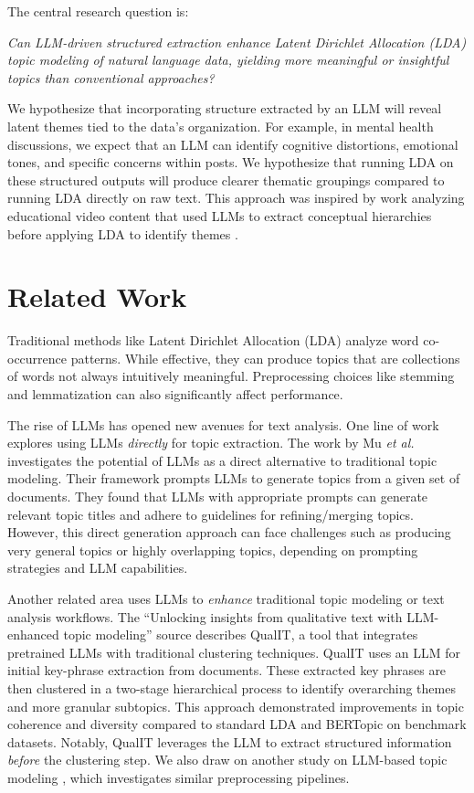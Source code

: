 \documentclass{article}
\begin{document}
The central research question is:

\begin{center}
    \emph{Can LLM-driven structured extraction enhance Latent Dirichlet Allocation (LDA) topic modeling of natural language data, yielding more meaningful or insightful topics than conventional approaches?}
\end{center}

We hypothesize that incorporating structure extracted by an LLM will reveal latent themes tied to the data's organization. For example, in mental health discussions, we expect that an LLM can identify cognitive distortions, emotional tones, and specific concerns within posts. We hypothesize that running LDA on these structured outputs will produce clearer thematic groupings compared to running LDA directly on raw text. This approach was inspired by work analyzing educational video content that used LLMs to extract conceptual hierarchies before applying LDA to identify themes \citep{HramirEduConceptLibrarian}.

\section{Related Work}

Traditional methods like Latent Dirichlet Allocation (LDA) \citep{Blei2003} analyze word co-occurrence patterns. While effective, they can produce topics that are collections of words not always intuitively meaningful. Preprocessing choices like stemming and lemmatization can also significantly affect performance.

The rise of LLMs has opened new avenues for text analysis. One line of work explores using LLMs \emph{directly} for topic extraction. The work by Mu \emph{et al.} investigates the potential of LLMs as a direct alternative to traditional topic modeling. Their framework prompts LLMs to generate topics from a given set of documents. They found that LLMs with appropriate prompts can generate relevant topic titles and adhere to guidelines for refining/merging topics. However, this direct generation approach can face challenges such as producing very general topics or highly overlapping topics, depending on prompting strategies and LLM capabilities.

Another related area uses LLMs to \emph{enhance} traditional topic modeling or text analysis workflows. The ``Unlocking insights from qualitative text with LLM-enhanced topic modeling'' source \citep{Bhaduri2024QualIT} describes QualIT, a tool that integrates pretrained LLMs with traditional clustering techniques. QualIT uses an LLM for initial key-phrase extraction from documents. These extracted key phrases are then clustered in a two-stage hierarchical process to identify overarching themes and more granular subtopics. This approach demonstrated improvements in topic coherence and diversity compared to standard LDA and BERTopic on benchmark datasets. Notably, QualIT leverages the LLM to extract structured information \emph{before} the clustering step. We also draw on another study on LLM-based topic modeling \citep{Mu2024LLM}, which investigates similar preprocessing pipelines.
\end{document}
